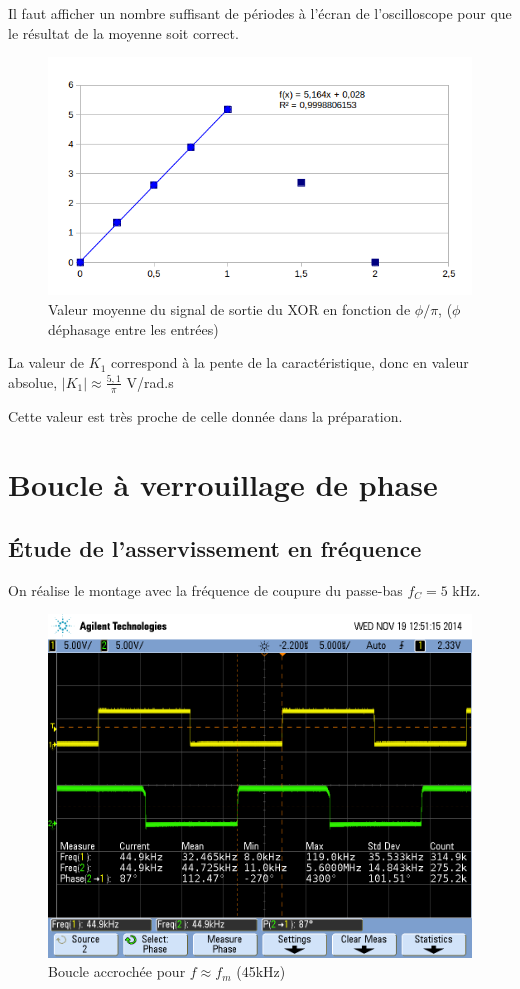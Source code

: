 \documentclass[../../Cours_M1.tex]{subfiles}
\begin{document}
\noindent Il faut afficher un nombre suffisant de périodes à l'écran de l'oscilloscope pour que le résultat de la moyenne soit correct.

\begin{figure}[h!]
\centering
\includegraphics[scale=0.8]{AATC/xor.png}
\caption{Valeur moyenne du signal de sortie du XOR en fonction de $\phi/\pi$, ($\phi$ déphasage entre les entrées)}
\end{figure}

La valeur de $K_1$ correspond à la pente de la caractéristique, donc en valeur absolue, $|K_1| \approx \frac{5,1}{\pi}$ V/rad.s

Cette valeur est très proche de celle donnée dans la préparation.

\newpage
\section{Boucle à verrouillage de phase}

\subsection{Étude de l'asservissement en fréquence}

On réalise le montage avec la fréquence de coupure du passe-bas $f_C = 5$ kHz.

\begin{figure}[h!]
\centering
\includegraphics[scale=0.3]{AATC/III145k.png}
\caption{Boucle accrochée pour $f \approx f_m$ (45kHz)}
\end{figure}
\end{document}
